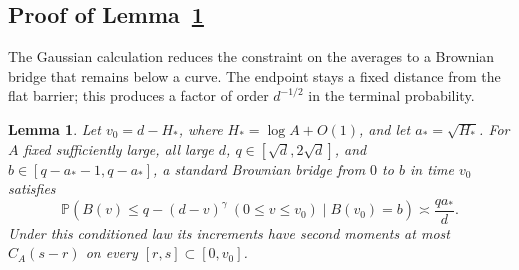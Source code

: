 \documentclass[11pt,letterpaper,reqno]{amsart}
\numberwithin{equation}{section}
\newtheorem{lemma}[theorem]{Lemma}
\theoremstyle{remark}
\begin{document}
\subsection{Proof of Lemma~\ref{lem:bridge}}\label{sec:bridge}
The Gaussian calculation reduces the constraint on the averages to a Brownian bridge that remains below a curve. The endpoint stays a fixed distance from the flat barrier; this produces a factor of order $d^{-1/2}$ in the terminal probability.
\begin{lemma}\label{lem:bridge}
Let $v_0=d-H_*$, where $H_*=\log A+O(1)$, and let $a_*=\sqrt{H_*}$.
For $A$ fixed sufficiently large, all large $d$, $q\in[\sqrt d,2\sqrt d]$, and
$b\in[q-a_*-1,q-a_*]$, a standard Brownian bridge from $0$ to $b$ in time $v_0$ satisfies
\begin{equation}\label{eq:7.12}
\mathbb P(B(v)\le q-(d-v)^\gamma\ (0\le v\le v_0)\mid B(v_0)=b)
\asymp\frac{qa_*}{d}.
\end{equation}
Under this conditioned law its increments have second moments at most
$C_A(s-r)$ on every $[r,s]\subset[0,v_0]$.
\end{lemma}
\end{document}
